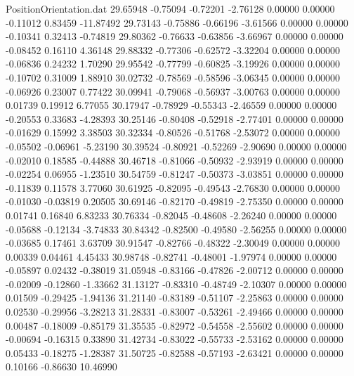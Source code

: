 \begin{filecontents}{PositionOrientation.dat}
  29.65948   -0.75094   -0.72201    -2.76128    0.00000    0.00000   -0.11012    0.83459  -11.87492
  29.73143   -0.75886   -0.66196    -3.61566    0.00000    0.00000   -0.10341    0.32413   -0.74819
  29.80362   -0.76633   -0.63856    -3.66967    0.00000    0.00000   -0.08452    0.16110    4.36148
  29.88332   -0.77306   -0.62572    -3.32204    0.00000    0.00000   -0.06836    0.24232    1.70290
  29.95542   -0.77799   -0.60825    -3.19926    0.00000    0.00000   -0.10702    0.31009    1.88910
  30.02732   -0.78569   -0.58596    -3.06345    0.00000    0.00000   -0.06926    0.23007    0.77422
  30.09941   -0.79068   -0.56937    -3.00763    0.00000    0.00000    0.01739    0.19912    6.77055
  30.17947   -0.78929   -0.55343    -2.46559    0.00000    0.00000   -0.20553    0.33683   -4.28393
  30.25146   -0.80408   -0.52918    -2.77401    0.00000    0.00000   -0.01629    0.15992    3.38503
  30.32334   -0.80526   -0.51768    -2.53072    0.00000    0.00000   -0.05502   -0.06961   -5.23190
  30.39524   -0.80921   -0.52269    -2.90690    0.00000    0.00000   -0.02010    0.18585   -0.44888
  30.46718   -0.81066   -0.50932    -2.93919    0.00000    0.00000   -0.02254    0.06955   -1.23510
  30.54759   -0.81247   -0.50373    -3.03851    0.00000    0.00000   -0.11839    0.11578    3.77060
  30.61925   -0.82095   -0.49543    -2.76830    0.00000    0.00000   -0.01030   -0.03819    0.20505
  30.69146   -0.82170   -0.49819    -2.75350    0.00000    0.00000    0.01741    0.16840    6.83233
  30.76334   -0.82045   -0.48608    -2.26240    0.00000    0.00000   -0.05688   -0.12134   -3.74833
  30.84342   -0.82500   -0.49580    -2.56255    0.00000    0.00000   -0.03685    0.17461    3.63709
  30.91547   -0.82766   -0.48322    -2.30049    0.00000    0.00000    0.00339    0.04461    4.45433
  30.98748   -0.82741   -0.48001    -1.97974    0.00000    0.00000   -0.05897    0.02432   -0.38019
  31.05948   -0.83166   -0.47826    -2.00712    0.00000    0.00000   -0.02009   -0.12860   -1.33662
  31.13127   -0.83310   -0.48749    -2.10307    0.00000    0.00000    0.01509   -0.29425   -1.94136
  31.21140   -0.83189   -0.51107    -2.25863    0.00000    0.00000    0.02530   -0.29956   -3.28213
  31.28331   -0.83007   -0.53261    -2.49466    0.00000    0.00000    0.00487   -0.18009   -0.85179
  31.35535   -0.82972   -0.54558    -2.55602    0.00000    0.00000   -0.00694   -0.16315    0.33890
  31.42734   -0.83022   -0.55733    -2.53162    0.00000    0.00000    0.05433   -0.18275   -1.28387
  31.50725   -0.82588   -0.57193    -2.63421    0.00000    0.00000    0.10166   -0.86630   10.46990

\end{filecontents}
